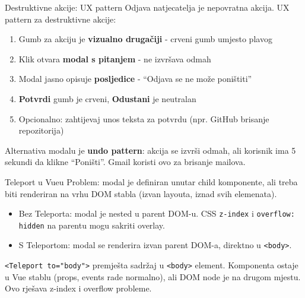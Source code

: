 \begin{frame}{Destruktivne akcije: UX pattern}
Odjava natjecatelja je nepovratna akcija. UX pattern za destruktivne akcije:

\vspace{0.4em}
\begin{enumerate}
  \item Gumb za akciju je \textbf{vizualno drugačiji} - crveni gumb umjesto plavog
  \item Klik otvara \textbf{modal s pitanjem} - ne izvršava odmah
  \item Modal jasno opisuje \textbf{posljedice} - \enquote{Odjava se ne može poništiti}
  \item \textbf{Potvrdi} gumb je crveni, \textbf{Odustani} je neutralan
  \item Opcionalno: zahtijevaj unos teksta za potvrdu (npr. GitHub brisanje repozitorija)
\end{enumerate}

\vspace{0.6em}
Alternativa modalu je \textbf{undo pattern}: akcija se izvrši odmah, ali korisnik ima 5 sekundi da klikne \enquote{Poništi}. Gmail koristi ovo za brisanje mailova.
\end{frame}

\begin{frame}{Teleport u Vueu}
Problem: modal je definiran unutar child komponente, ali treba biti renderiran na vrhu DOM stabla (izvan layouta, iznad svih elemenata).

\vspace{0.4em}
\begin{itemize}
  \item Bez Teleporta: modal je nested u parent DOM-u. CSS \texttt{z-index} i \texttt{overflow: hidden} na parentu mogu sakriti overlay.
  \item S Teleportom: modal se renderira izvan parent DOM-a, direktno u \texttt{<body>}.
\end{itemize}

\vspace{0.6em}
\texttt{<Teleport to="body">} premješta sadržaj u \texttt{<body>} element. Komponenta ostaje u Vue stablu (props, events rade normalno), ali DOM node je na drugom mjestu. Ovo rješava z-index i overflow probleme.
\end{frame}

